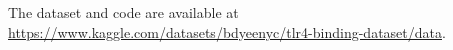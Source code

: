 \documentclass[preprint, 10pt]{elsarticle}
\begin{document}
The dataset and code are available at \url{https://www.kaggle.com/datasets/bdyeenyc/tlr4-binding-dataset/data}.






\end{document}
